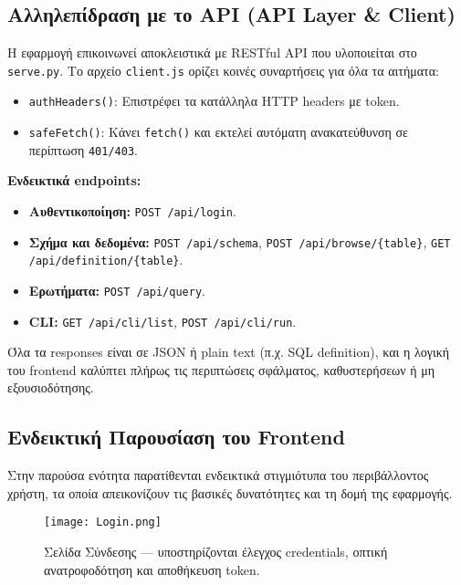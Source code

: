 \documentclass[13pt]{extarticle}
\begin{document}
\subsection{Αλληλεπίδραση με το API (API Layer \& Client)}

Η εφαρμογή επικοινωνεί αποκλειστικά με RESTful API που υλοποιείται στο \texttt{serve.py}. Το αρχείο \texttt{client.js} ορίζει κοινές συναρτήσεις για όλα τα αιτήματα:

\begin{itemize}
    \item \texttt{authHeaders()}: Επιστρέφει τα κατάλληλα HTTP headers με token.
    \item \texttt{safeFetch()}: Κάνει \texttt{fetch()} και εκτελεί αυτόματη ανακατεύθυνση σε περίπτωση \texttt{401/403}.
\end{itemize}

\vspace{0.5em}
\textbf{Ενδεικτικά endpoints:}
\begin{itemize}
    \item \textbf{Αυθεντικοποίηση:} \texttt{POST /api/login}.
    \item \textbf{Σχήμα και δεδομένα:} \texttt{POST /api/schema}, \texttt{POST /api/browse/\{table\}}, \texttt{GET /api/definition/\{table\}}.
    \item \textbf{Ερωτήματα:} \texttt{POST /api/query}.
    \item \textbf{CLI:} \texttt{GET /api/cli/list}, \texttt{POST /api/cli/run}.
\end{itemize}

Όλα τα responses είναι σε JSON ή plain text (π.χ. SQL definition), και η λογική του frontend καλύπτει πλήρως τις περιπτώσεις σφάλματος, καθυστερήσεων ή μη εξουσιοδότησης.

\clearpage
\subsection{Ενδεικτική Παρουσίαση του Frontend}

Στην παρούσα ενότητα παρατίθενται ενδεικτικά στιγμιότυπα του περιβάλλοντος χρήστη, τα οποία απεικονίζουν τις βασικές δυνατότητες και τη δομή της εφαρμογής.

\vspace{1.5cm}
\begin{figure}[H]
    \centering
    \texttt{[image: Login.png]}
    \caption{Σελίδα Σύνδεσης — υποστηρίζονται έλεγχος credentials, οπτική ανατροφοδότηση και αποθήκευση token.}
\end{figure}
\end{document}
